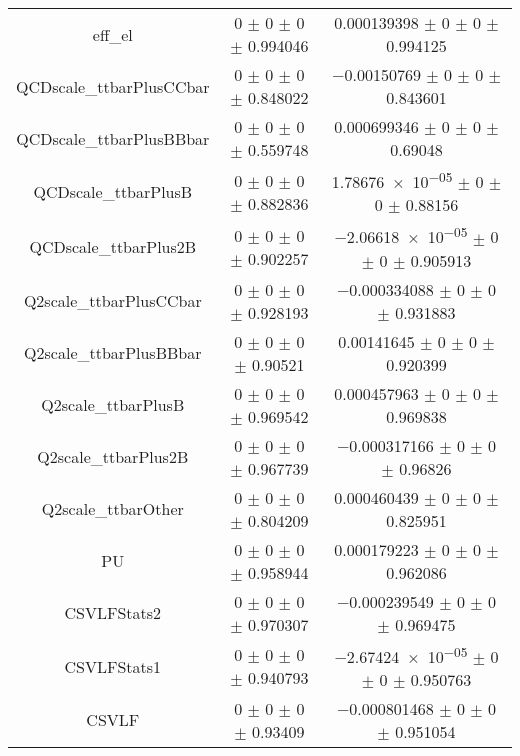 \begin{table}
\begin{tabular}{ccc}
eff\_el 	& \num{0} $\pm$ \num{0} $\pm$ \num{0} $\pm$ \num{0.994046} 	& \num{0.000139398} $\pm$ \num{0} $\pm$ \num{0} $\pm$ \num{0.994125}\\
QCDscale\_ttbarPlusCCbar 	& \num{0} $\pm$ \num{0} $\pm$ \num{0} $\pm$ \num{0.848022} 	& \num{-0.00150769} $\pm$ \num{0} $\pm$ \num{0} $\pm$ \num{0.843601}\\
QCDscale\_ttbarPlusBBbar 	& \num{0} $\pm$ \num{0} $\pm$ \num{0} $\pm$ \num{0.559748} 	& \num{0.000699346} $\pm$ \num{0} $\pm$ \num{0} $\pm$ \num{0.69048}\\
QCDscale\_ttbarPlusB 	& \num{0} $\pm$ \num{0} $\pm$ \num{0} $\pm$ \num{0.882836} 	& \num{1.78676e-05} $\pm$ \num{0} $\pm$ \num{0} $\pm$ \num{0.88156}\\
QCDscale\_ttbarPlus2B 	& \num{0} $\pm$ \num{0} $\pm$ \num{0} $\pm$ \num{0.902257} 	& \num{-2.06618e-05} $\pm$ \num{0} $\pm$ \num{0} $\pm$ \num{0.905913}\\
Q2scale\_ttbarPlusCCbar 	& \num{0} $\pm$ \num{0} $\pm$ \num{0} $\pm$ \num{0.928193} 	& \num{-0.000334088} $\pm$ \num{0} $\pm$ \num{0} $\pm$ \num{0.931883}\\
Q2scale\_ttbarPlusBBbar 	& \num{0} $\pm$ \num{0} $\pm$ \num{0} $\pm$ \num{0.90521} 	& \num{0.00141645} $\pm$ \num{0} $\pm$ \num{0} $\pm$ \num{0.920399}\\
Q2scale\_ttbarPlusB 	& \num{0} $\pm$ \num{0} $\pm$ \num{0} $\pm$ \num{0.969542} 	& \num{0.000457963} $\pm$ \num{0} $\pm$ \num{0} $\pm$ \num{0.969838}\\
Q2scale\_ttbarPlus2B 	& \num{0} $\pm$ \num{0} $\pm$ \num{0} $\pm$ \num{0.967739} 	& \num{-0.000317166} $\pm$ \num{0} $\pm$ \num{0} $\pm$ \num{0.96826}\\
Q2scale\_ttbarOther 	& \num{0} $\pm$ \num{0} $\pm$ \num{0} $\pm$ \num{0.804209} 	& \num{0.000460439} $\pm$ \num{0} $\pm$ \num{0} $\pm$ \num{0.825951}\\
PU 	& \num{0} $\pm$ \num{0} $\pm$ \num{0} $\pm$ \num{0.958944} 	& \num{0.000179223} $\pm$ \num{0} $\pm$ \num{0} $\pm$ \num{0.962086}\\
CSVLFStats2 	& \num{0} $\pm$ \num{0} $\pm$ \num{0} $\pm$ \num{0.970307} 	& \num{-0.000239549} $\pm$ \num{0} $\pm$ \num{0} $\pm$ \num{0.969475}\\
CSVLFStats1 	& \num{0} $\pm$ \num{0} $\pm$ \num{0} $\pm$ \num{0.940793} 	& \num{-2.67424e-05} $\pm$ \num{0} $\pm$ \num{0} $\pm$ \num{0.950763}\\
CSVLF 	& \num{0} $\pm$ \num{0} $\pm$ \num{0} $\pm$ \num{0.93409} 	& \num{-0.000801468} $\pm$ \num{0} $\pm$ \num{0} $\pm$ \num{0.951054}\\

\end{tabular}
\end{table}
